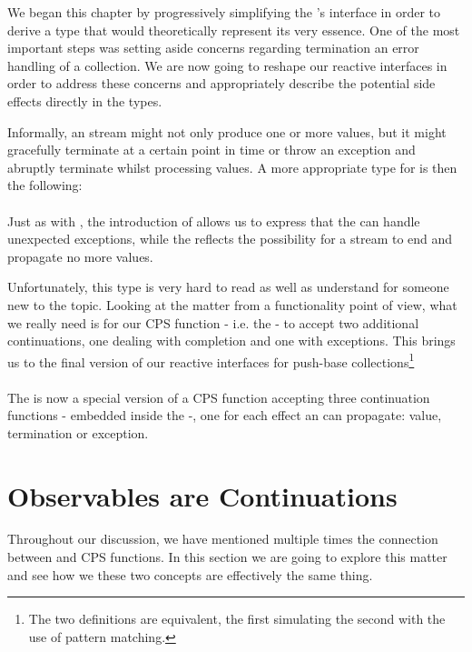 We began this chapter by progressively simplifying the 's interface in order to derive a type that would theoretically represent its very essence. One of the most important steps was setting aside concerns regarding termination an error handling of a collection. We are now going to reshape our reactive interfaces in order to address these concerns and appropriately describe the potential side effects directly in the types. 

Informally, an  stream might not only produce one or more values, but it might gracefully terminate at a certain point in time or throw an exception and abruptly terminate whilst processing values. A more appropriate type for  is then the following:\\

\\

Just as with , the introduction of  allows us to express that the  can handle unexpected exceptions, while the  reflects the possibility for a stream to end and propagate no more values. 

Unfortunately, this type is very hard to read as well as understand for someone new to the topic. Looking at the matter from a functionality point of view, what we really need is for our CPS function - i.e. the  - to accept two additional continuations, one dealing with completion and one with exceptions. This brings us to the final version of our reactive interfaces for push-base collections\footnote{The two definitions are equivalent, the first simulating the second with the use of pattern matching.}\\

\\

The  is now a special version of a CPS function accepting three continuation functions - embedded inside the  -, one for each effect an  can propagate: value, termination or exception.

\section{Observables are Continuations}
\label{obscont}

Throughout our discussion, we have mentioned multiple times the connection between  and CPS functions. In this section we are going to explore this matter and see how we these two concepts are effectively the same thing.

